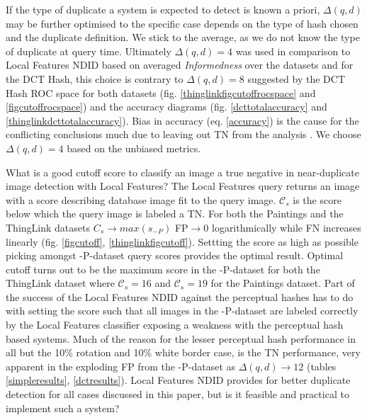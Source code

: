 \documentclass[english,12pt,a4paper,pdftex,elec,utf8, table]{aaltothesis}
\begin{document}
If the type of duplicate a system is expected to detect is known a priori, $\Delta(q,d)$ may be further optimised to the specific case depends on the type of hash chosen and the duplicate definition. We stick to the average, as we do not know the type of duplicate at query time. Ultimately $\Delta(q,d)=4$ was used in comparison to Local Features NDID based on averaged \emph{Informedness} over the datasets and for the DCT Hash, this choice is contrary to $\Delta(q,d)=8$ suggested by the DCT Hash ROC space for both datasets (fig. \ref{thinglinkfigcutoffrocspace} and \ref{figcutoffrocspace}) and the accuracy diagrams (fig. \ref{dcttotalaccuracy} and \ref{thinglinkdcttotalaccuracy}). Bias in accuracy (eq. \ref{accuracy}) is the cause for the conflicting conclusions much due to leaving out TN from the analysis \cite{POWERS2011}. We choose $\Delta(q,d)=4$ based on the unbiased metrics.

What is a good cutoff score to classify an image a true negative in near-duplicate image detection with Local Features? The Local Features query returns an image with a score describing database image fit to the query image. $\mathcal{C}_s$ is the score below which the query image is labeled a TN. For both the Paintings and the ThingLink datasets $C_s \rightarrow max(s_{-P})$ FP$\rightarrow 0$ logarithmically while FN increases linearly (fig. \ref{figcutoff}, \ref{thinglinkfigcutoff}). Settting the score as high as possible picking amongst -P-dataset query scores provides the optimal result. Optimal cutoff turns out to be the maximum score in the -P-dataset for both the ThingLink dataset where $\mathcal{C}_s=16$ and $\mathcal{C}_s=19$ for the Paintings dataset. Part of the success of the Local Features NDID against the perceptual hashes has to do with setting the score such that all images in the -P-dataset are labeled correctly by the Local Features classifier exposing a weakness with the perceptual hash based systems. Much of the reason for the lesser perceptual hash performance in all but the 10\% rotation and 10\% white border case, is the TN performance, very apparent in the exploding FP from the -P-dataset as $\Delta(q,d)\rightarrow12$ (tables \ref{simpleresults}, \ref{dctresults}). Local Features NDID provides for better duplicate detection for all cases discussed in this paper, but is it feasible and practical to implement such a system?
\end{document}
